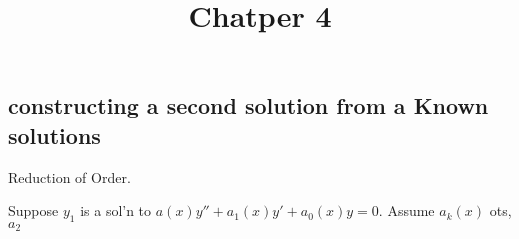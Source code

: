 \documentclass{article}
\title{Chatper 4}
\begin{document}
\maketitle
\pagebreak

\subsection{}
\subsection{constructing a second solution from a Known solutions}

\bdefn
Reduction of Order.

Suppose $y_{1}$ is a sol'n to $a(x)y'' + a_{1}(x)y' + a_{0}(x)y = 0$. 
Assume  $a_{k}(x)$ ots, $a_{2}$

\edefn
\end{document}
